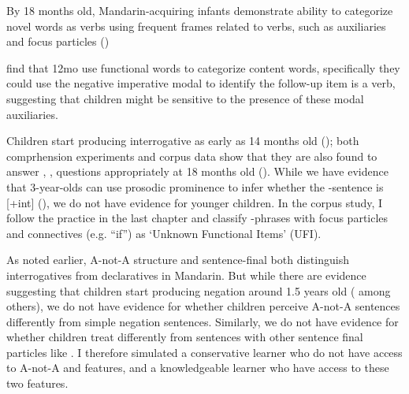  By 18 months old, Mandarin-acquiring infants demonstrate ability to categorize novel words as verbs using frequent frames related to verbs, such as auxiliaries and focus particles (\cite{zhangshili2015infant})

  \cite{zhangshili2015infant} find that 12mo use functional words to categorize content words, specifically they could use the negative imperative modal  to identify the follow-up item is a verb, suggesting that children might be sensitive to the presence of these modal auxiliaries.  %


 Children start producing interrogative \twh{} as early as 14 months old (\cite{lee1989acq, fan2012, linjing2014}); both comprhension experiments and corpus data show that they are also found to answer , ,  questions appropriately at 18 months old (\citealt{fan2012,moradlou2020}). While we have evidence that 3-year-olds can use prosodic prominence to infer whether the \twh-sentence is [+int] (\cite{WHanything}), we do not have evidence for younger children. In the corpus study, I follow the practice in the last chapter and classify \twh-phrases with focus particles and connectives (e.g.  ``if'') as `Unknown Functional Items' (UFI).

 As noted earlier, A-not-A structure and sentence-final  both distinguish interrogatives from declaratives in Mandarin. But while there are evidence suggesting that children start producing negation around 1.5 years old (\cite{lee1982,fan2007,li2019neg, huang2022manchild} among others), we do not have evidence for whether children perceive A-not-A sentences differently from simple negation sentences. Similarly, we do not have evidence for whether children treat  differently from sentences with other sentence final particles like . I therefore simulated a conservative learner who do not have access to A-not-A and  features, and a knowledgeable learner who have access to these two features. 





